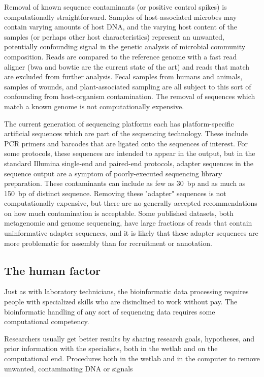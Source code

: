 \documentclass[graybox]{svmult}
\begin{document}
        Removal of known sequence contaminants (or positive control spikes) is computationally straightforward.   Samples of host-associated microbes may contain varying amounts of host DNA, and the varying host content of the samples (or perhaps other host characteristics) represent an unwanted, potentially confounding signal in the genetic analysis of microbial community composition.  Reads are compared to the reference genome with a fast read aligner (bwa and bowtie are the current state of the art) and reads that match are excluded from further analysis.   Fecal samples from humans and animals, samples of wounds, and plant-associated sampling are all subject to this sort of confounding from host-organism contamination.  The removal of sequences which match a known genome is not computationally expensive.

        The current generation of sequencing platforms each has platform-specific artificial sequences which are part of the sequencing technology.  These include PCR primers and barcodes that are ligated onto the sequences of interest.
For some protocols, these sequences are intended to appear in the output, but in the standard Illumina single-end and paired-end protocols, adapter sequences in the sequence output are a symptom of poorly-executed sequencing library preparation.
These contaminants can include as few as 30~bp and as much as 150~bp of distinct sequence.   Removing these "adapter" sequences is not computationally expensive, but there are no generally accepted recommendations on how much contamination is acceptable.
Some published datasets, both metagenomic and genome sequencing, have large fractions of reads that contain uninformative adapter sequences, and it is likely that these adapter sequences are more problematic for assembly than for recruitment or annotation.

\subsection{The human factor}
Just as with laboratory technicians, the bioinformatic data processing requires people with specialized skills who are disinclined to work without pay.  
The bioinformatic handling of any sort of sequencing data requires some computational competency.

Researchers usually get better results by sharing research goals, hypotheses, and prior information with the specialists, both in the wetlab and on the computational end.  Procedures both in the wetlab and in the computer to remove unwanted, contaminating DNA or signals 
\end{document}

